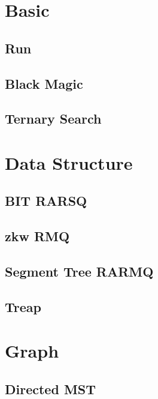 \section{Basic}
    \subsection{Run}
        
    \subsection{Black Magic}
         
    \subsection{Ternary Search}
         

\section{Data Structure}
    \subsection{BIT RARSQ}
        
    \subsection{zkw RMQ}
        
    \subsection{Segment Tree RARMQ}
        
    \subsection{Treap}
        

\section{Graph}
    \subsection{Directed MST}
        
